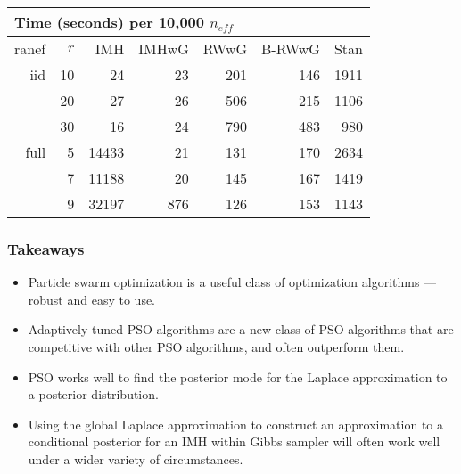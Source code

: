 \documentclass[xcolor=dvipsnames]{beamer}
\begin{document}
\begin{frame}
{%

\begin{tabular}{rrrrrrr}
\multicolumn{7}{l}{Time (seconds) per 10,000 $n_{eff}$}\\
  \hline
ranef & $r$ & IMH & IMHwG & RWwG & B-RWwG & Stan \\ 
  \hline
iid&10 & 24 & 23 & 201 & 146 & 1911 \\ 
  &20 & 27 & 26 & 506 & 215 & 1106 \\ 
  &30 & 16 & 24 & 790 & 483 & 980 \\ \hline
  full&5 & 14433 & 21 & 131 & 170 & 2634 \\ 
  &7 & 11188 & 20 & 145 & 167 & 1419 \\ 
  &9 & 32197 & 876 & 126 & 153 & 1143 \\ 
   \hline
\end{tabular}
}
\end{frame}

\begin{frame}
\frametitle{Takeaways}
\begin{itemize}
\item Particle swarm optimization is a useful class of optimization algorithms --- robust and easy to use.\vspace{0.3cm}
\item Adaptively tuned PSO algorithms are a new class of PSO algorithms that are competitive with other PSO algorithms, and often outperform them.\vspace{0.5cm}
\item PSO works well to find the posterior mode for the Laplace approximation to a posterior distribution.\vspace{0.3cm}
\item Using the global Laplace approximation to construct an approximation to a conditional posterior for an IMH within Gibbs sampler will often work well under a wider variety of circumstances.
\end{itemize}
\end{frame}
\end{document}
